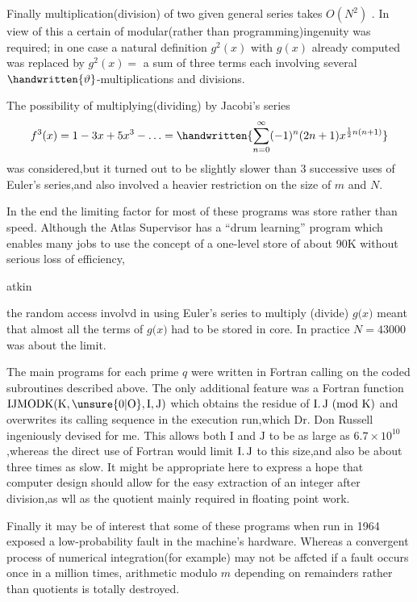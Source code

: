 Finally multiplication(division) of two given general series takes $O(N^{2})$ . In view of this a certain  of modular(rather than programming)ingenuity was required; in one case a natural definition $g^{2}(x)$ with $g(x)$ already computed was replaced by $g^{2}(x)=$ a sum of three terms each involving several $\handwritten{\vartheta}$-multiplications and divisions.

The possibility of multiplying(dividing) by Jacobi's series
\[
f^{3}(x)=1-3x+5x^{3}-\ldots=\handwritten{\sum_{n=0}^{\infty}(-1)^{n}(2n+1)x^{\frac12 n(n+1)}}
\]
was considered,but it turned out to be slightly slower than 3 successive uses of Euler's series,and also involved a heavier restriction on the size of $m$ and $N$.

In the end the limiting factor for most of these programs was store rather than speed. Although the Atlas Supervisor has a ``drum learning'' program which enables many jobs to use the concept of a one-level store of about 90K without serious loss of efficiency,
\normalmarginpar
\begin{flushright}
atkin 
\end{flushright}

\reversemarginpar the random access involv\margin{\handwritten{/}}d in using Euler's series to multiply (divide) \uline{$g(x$}$)$ meant that almost all the terms of \uline{$g(x$}$)$ had to be stored in core. In practice $N=43000$ was about the limit.

The main programs for each prime \uline{$q$} were written in Fortran calling on the coded subroutines described above. The only additional feature was a Fortran function $\mathrm{IJMODK}(\mathrm{K},\unsure{0|\mathrm{O}},\mathrm{I},\mathrm{J})$ which obtains the residue of $\mathrm{I}\ldotp\mathrm{J}\ (\mathrm{mod}\ \mathrm{K})$ and overwrites its calling sequence in the\normalmarginpar{} execution run,which Dr. Don Russell ingeniously devised for me. This allows both $\mathrm{I}$ and $\mathrm{J}$ to be as large as $6.7\times10^{10}$,whereas the direct use of Fortran would limit $\mathrm{I}\ldotp\mathrm{J}$ to this size,and also be about three times as slow. It might be appropriate here to express a hope that computer design should allow for the easy extraction of an integer \uline{} after division,as \reversemarginpar w\margin{\handwritten{/}}ll as the quotient mainly required in floating point work.

Finally it may be of interest that some of these programs when run in 1964 exposed a low-probability  fault in the machine's hardware. Whereas a convergent process of numerical integration(for example) may not be affcted if a fault occurs once in a million times, arithmetic modulo \uline{$m$} depending on remainders rather than quotients is totally destroyed.
\normalmarginpar
